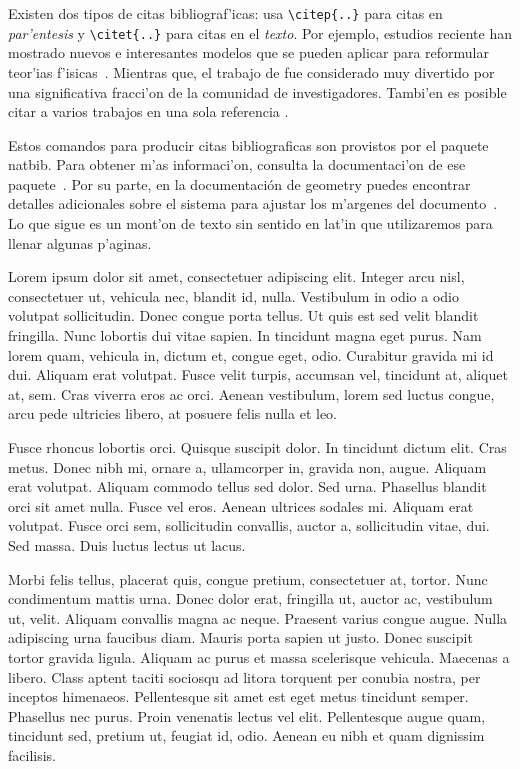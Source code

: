 Existen dos tipos de citas bibliograf'icas: usa \verb|\citep{..}| para
citas en \emph{par'entesis} y \verb|\citet{..}| para citas
en el \emph{texto}. Por ejemplo, estudios reciente han mostrado nuevos e
interesantes modelos que se pueden aplicar para reformular teor'ias
f'isicas~\citep{NewCam97}. Mientras que, el trabajo de \citet{Rofl06} fue
considerado muy divertido por una significativa fracci'on de la comunidad
de investigadores. Tambi'en es posible citar a varios trabajos en una sola
referencia \citep{Lamport86,Knuth84}.

Estos comandos para producir citas bibliograficas son provistos por
el paquete \textsf{natbib}. Para obtener m'as informaci'on, consulta la
documentaci'on de ese paquete~\citep{doc:natbib}. Por su parte, en
la documentaci\'on de \textsf{geometry} puedes encontrar detalles
adicionales sobre el sistema para ajustar los m'argenes del
documento~\citep{doc:geometry}. Lo que sigue
es un mont'on de texto sin sentido en lat'in que utilizaremos para llenar
algunas p'aginas.

Lorem ipsum dolor sit amet, consectetuer adipiscing elit. Integer arcu nisl,
consectetuer ut, vehicula nec, blandit id, nulla. Vestibulum in odio a odio
volutpat sollicitudin. Donec congue porta tellus. Ut quis est sed velit
blandit fringilla. Nunc lobortis dui vitae sapien. In tincidunt magna eget
purus. Nam lorem quam, vehicula in, dictum et, congue eget, odio. Curabitur
gravida mi id dui. Aliquam erat volutpat. Fusce velit turpis, accumsan vel,
tincidunt at, aliquet at, sem. Cras viverra eros ac orci. Aenean vestibulum,
lorem sed luctus congue, arcu pede ultricies libero, at posuere felis nulla
et leo.

Fusce rhoncus lobortis orci. Quisque suscipit dolor. In tincidunt dictum
elit. Cras metus. Donec nibh mi, ornare a, ullamcorper in, gravida non,
augue. Aliquam erat volutpat. Aliquam commodo tellus sed dolor. Sed urna.
Phasellus blandit orci sit amet nulla. Fusce vel eros. Aenean ultrices
sodales mi. Aliquam erat volutpat. Fusce orci sem, sollicitudin convallis,
auctor a, sollicitudin vitae, dui. Sed massa. Duis luctus lectus ut lacus.

Morbi felis tellus, placerat quis, congue pretium, consectetuer at, tortor.
Nunc condimentum mattis urna. Donec dolor erat, fringilla ut, auctor ac,
vestibulum ut, velit. Aliquam convallis magna ac neque. Praesent varius
congue augue. Nulla adipiscing urna faucibus diam. Mauris porta sapien ut
justo. Donec suscipit tortor gravida ligula. Aliquam ac purus et massa
scelerisque vehicula. Maecenas a libero. Class aptent taciti sociosqu ad
litora torquent per conubia nostra, per inceptos himenaeos. Pellentesque
sit amet est eget metus tincidunt semper. Phasellus nec purus. Proin
venenatis lectus vel elit. Pellentesque augue quam, tincidunt sed, pretium
ut, feugiat id, odio. Aenean eu nibh et quam dignissim facilisis.

